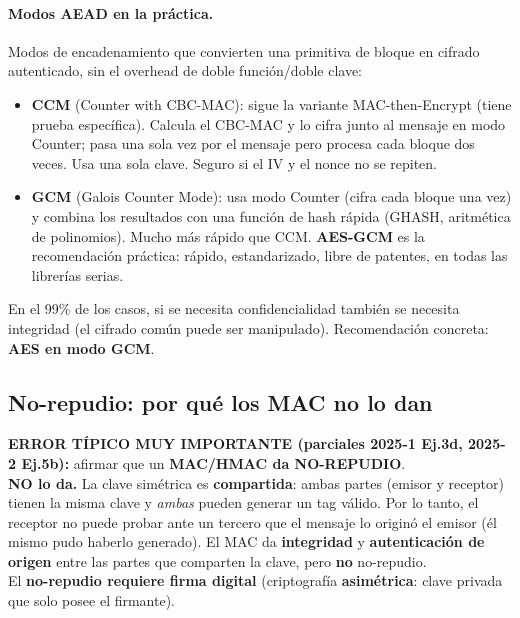 \documentclass[../main.tex]{subfiles}
\begin{document}
\paragraph{Modos AEAD en la práctica.} Modos de encadenamiento que convierten una
primitiva de bloque en cifrado autenticado, sin el overhead de doble función/doble
clave:
\begin{itemize}[leftmargin=1.4em,nosep]
  \item \textbf{CCM} (Counter with CBC-MAC): sigue la variante MAC-then-Encrypt (tiene
  prueba específica). Calcula el CBC-MAC y lo cifra junto al mensaje en modo Counter;
  pasa una sola vez por el mensaje pero procesa cada bloque dos veces. Usa una sola
  clave. Seguro si el IV y el nonce no se repiten.
  \item \textbf{GCM} (Galois Counter Mode): usa modo Counter (cifra cada bloque una
  vez) y combina los resultados con una función de hash rápida (GHASH, aritmética de
  polinomios). Mucho más rápido que CCM. \textbf{AES-GCM} es la recomendación práctica:
  rápido, estandarizado, libre de patentes, en todas las librerías serias.
\end{itemize}

\begin{destacado}
 En el 99\% de los casos, si se necesita confidencialidad también se
necesita integridad (el cifrado común puede ser manipulado). Recomendación concreta:
\textbf{AES en modo GCM}.
\end{destacado}

\subsection{No-repudio: por qué los MAC no lo dan}

\begin{ojo}
\textbf{ERROR TÍPICO MUY IMPORTANTE (parciales 2025-1 Ej.3d, 2025-2 Ej.5b):}
afirmar que un \textbf{MAC/HMAC da NO-REPUDIO}.\\[4pt]
\textbf{NO lo da.} La clave simétrica es \textbf{compartida}: ambas partes (emisor y
receptor) tienen la misma clave y \emph{ambas} pueden generar un tag válido. Por lo
tanto, el receptor no puede probar ante un tercero que el mensaje lo originó el
emisor (él mismo pudo haberlo generado). El MAC da \textbf{integridad} y
\textbf{autenticación de origen} entre las partes que comparten la clave, pero
\textbf{no} no-repudio.\\[4pt]
El \textbf{no-repudio requiere firma digital} (criptografía \textbf{asimétrica}:
clave privada que solo posee el firmante).
\end{ojo}
\end{document}
